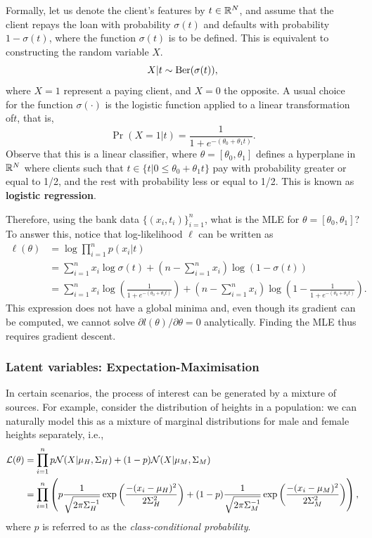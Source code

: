 Formally, let us denote the client’s features by $t \in \mathbb{R}^N$, and assume that the client repays the loan with probability $\sigma(t)$ and defaults with probability $1 - \sigma(t)$, where the function $\sigma(t)$ is to be defined. This is equivalent to constructing the random variable $X$.
\begin{equation}
 	X|t \sim \text{Ber}{(\sigma(t))},
 \end{equation} 
 where $X=1$ represent a paying client, and $X=0$ the opposite. A usual choice for the function $\sigma(\cdot)$ is the logistic function applied to a linear transformation of$t$, that is, 
 \begin{equation}
 	\Pr{(X=1|t)} = \frac{1}{1+e^{-(\theta_0 + \theta_1 t)	}}.
 \end{equation}
Observe that this is a linear classifier, where $\theta = [\theta_0, \theta_1]$ defines a hyperplane in $\mathbb{R}^N$ where clients such that $t\in\{t | 0\leq \theta_0 + \theta_1 t\}$ pay with probability greater or equal to 1/2, and the rest with probability less or equal to 1/2. This is known as \textbf{logistic regression}. 

Therefore, using the bank data $\{(x_i,t_i)\}_{i=1}^n$, what is the MLE for $\theta = [\theta_0, \theta_1]$? To answer this, notice that log-likelihood $\ell$ can be written as 
\begin{align*}
	\ell(\theta) &= \log \prod_{i=1}^n p(x_i|t) \\
			  &= \sum_{i=1}^n x_i \log \sigma(t) + \left(n-\sum_{i=1}^n x_i\right)\log(1-\sigma(t))\\
			  &= \sum_{i=1}^n x_i \log \left(\frac{1}{1+e^{-(\theta_0 + \theta_1 t)	}}\right) + \left(n-\sum_{i=1}^n x_i\right)\log\left(1-\frac{1}{1+e^{-(\theta_0 + \theta_1 t)	}}\right).
\end{align*}
This expression does not have a global minima and, even though its gradient can be computed, we cannot solve $\partial l(\theta)/\partial \theta =0$ analytically. Finding the MLE thus requires gradient descent.  

\subsubsection{Latent variables: Expectation-Maximisation} 
\label{sub:EM}

In certain scenarios, the process of interest can be generated by a mixture of sources. For example, consider the distribution of heights in a population: we can naturally model this as a mixture of marginal distributions for male and female heights separately, i.e.,
\begin{align*} 
\mathcal{L}(\theta) &= \prod_{i=1}^n  p{\mathcal N}(X|\mu_H,\Sigma_H) + (1-p){\mathcal N}(X|\mu_M,\Sigma_M) \\ 
&= \prod_{i=1}^n \left( p\frac{1}{\sqrt{2\pi\Sigma_H^{-1}}}\exp\left(\frac{-(x_i-\mu_H)^2}{2\Sigma^2_H}\right) + (1-p)\frac{1}{\sqrt{2\pi\Sigma_M^{-1}}}\exp\left(\frac{-(x_i-\mu_M)^2}{2\Sigma^2_M}\right)\right),
\end{align*}
where $p$ is referred to as the \emph{class-conditional probability}.

